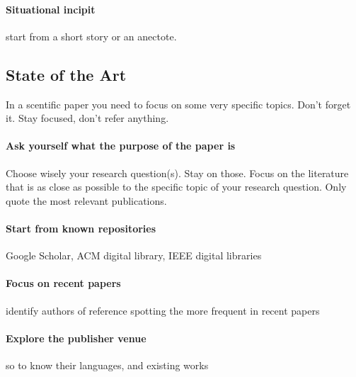 \documentclass{article}
\begin{document}
\paragraph{Situational incipit} start from a short story or an anectote.

\subsection{State of the Art}
In a scentific paper you need to focus on some very specific topics. Don't forget it. Stay focused, don't refer anything.
\paragraph{Ask yourself what the purpose of the paper is} Choose wisely your research question(s). Stay on those. Focus on the literature that is as close as possible to the specific topic of your research question. Only quote the most relevant publications. 
\paragraph{Start from known repositories} Google Scholar, ACM digital library, IEEE digital libraries
\paragraph{Focus on recent papers} identify authors of reference spotting the more frequent in recent papers
\paragraph{Explore the publisher venue} so to know their languages, and existing works
\end{document}

